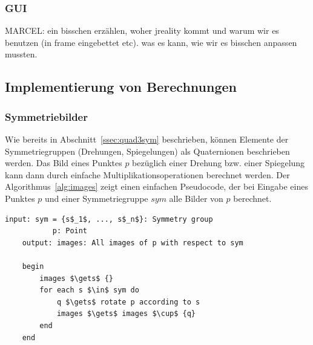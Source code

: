         \subsubsection{GUI\label{ssec:gui}}
             MARCEL: ein bisschen erzählen, woher jreality kommt und warum wir es benutzen (in frame eingebettet etc). was es kann, wie wir es bisschen anpassen mussten.
                
\subsection{Implementierung von Berechnungen}
    \subsubsection{Symmetriebilder}
        Wie bereits in Abschnitt~\ref{ssec:quad3sym} beschrieben, können Elemente der Symmetriegruppen (Drehungen, Spiegelungen) als Quaternionen beschrieben werden.
        Das Bild eines Punktes $p$ bezüglich einer Drehung bzw. einer Spiegelung kann dann durch einfache Multiplikationsoperationen berechnet werden.
        Der Algorithmus~\ref{alg:images} zeigt einen einfachen Pseudocode, der bei Eingabe eines Punktes $p$ und einer Symmetriegruppe $sym$ alle Bilder von $p$ berechnet.

        \begin{lstlisting}[mathescape, morekeywords={for, each, do, begin,input, output, end, return}, caption={Peusdocode der Bildmengenberechnung}, label=alg:images]
    input: sym = {s$_1$, ..., s$_n$}: Symmetry group
           p: Point
    output: images: All images of p with respect to sym
    
    begin
        images $\gets$ {}
        for each s $\in$ sym do
            q $\gets$ rotate p according to s
            images $\gets$ images $\cup$ {q}
        end
    end
        \end{lstlisting}
